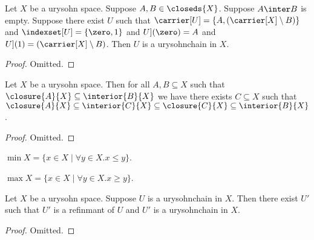 \begin{proposition}\label{urysohnchain_induction_begin_step_two}
    Let $X$ be a urysohn space.
    Suppose $A,B \in \closeds{X}$.
    Suppose $A \inter B$ is empty.
    Suppose there exist $U$
    such that $\carrier[U] = \{A,(\carrier[X] \setminus B)\}$
    and $\indexset[U]= \{\zero, 1\}$
    and $\index[U](\zero) = A$
    and $\index[U](1) = (\carrier[X] \setminus B)$.
    Then $U$ is a urysohnchain in $X$.
\end{proposition}
\begin{proof}
    Omitted.
\end{proof}



\begin{proposition}\label{t_four_propositon}
    Let $X$ be a urysohn space.
    Then for all $A,B \subseteq X$ such that $\closure{A}{X} \subseteq \interior{B}{X}$
    we have there exists $C \subseteq X$ such that 
    $\closure{A}{X} \subseteq \interior{C}{X} \subseteq \closure{C}{X} \subseteq \interior{B}{X}$.
\end{proposition}
\begin{proof}
    Omitted.
\end{proof}

\begin{definition}\label{minimum}
    $\min{X} = \{x \in X \mid \forall y \in X. x \leq y \}$.
\end{definition}

\begin{definition}\label{maximum}
    $\max{X} = \{x \in X \mid \forall y \in X. x \geq y \}$.
\end{definition}

\begin{proposition}\label{urysohnchain_induction_step_existence}
    Let $X$ be a urysohn space.
    Suppose $U$ is a urysohnchain in $X$.
    Then there exist $U'$ such that $U'$ is a refinmant of $U$ and $U'$ is a urysohnchain in $X$.
\end{proposition}
\begin{proof}

    
    
    Omitted.

\end{proof}

